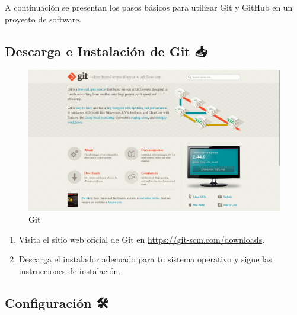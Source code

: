 \documentclass[
  a4paper,
  DIV=11,
  numbers=noendperiod,
  onepage,
  openany]{scrreprt}
\providecommand{\tightlist}{%
  \setlength{\itemsep}{0pt}\setlength{\parskip}{0pt}}\usepackage{longtable,booktabs,array}
\begin{document}
A continuación se presentan los pasos básicos para utilizar Git y GitHub
en un proyecto de software.

\subsection{Descarga e Instalación de Git
📥}\label{descarga-e-instalaciuxf3n-de-git}

\begin{figure}[H]

{\centering \includegraphics[width=6.25in,height=\textheight,keepaspectratio]{unidades/unidad0/../../images/website-git.png}

}

\caption{Git}

\end{figure}%

\begin{enumerate}
\def\labelenumi{\arabic{enumi}.}
\tightlist
\item
  Visita el sitio web oficial de Git en
  \url{https://git-scm.com/downloads}.
\item
  Descarga el instalador adecuado para tu sistema operativo y sigue las
  instrucciones de instalación.
\end{enumerate}

\subsection{Configuración 🛠️}\label{configuraciuxf3n}
\end{document}
